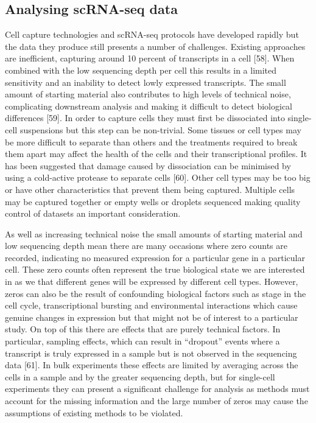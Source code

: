 \documentclass[11pt,a4paper,titlepage,twoside,openright]{style/unimelbthesis}
\theoremstyle{definition}
\theoremstyle{definition}
\theoremstyle{definition}
\theoremstyle{remark}
\begin{document}
\begin{mainmatter}
\hypertarget{intro-analysis}{%
\section{Analysing scRNA-seq data}\label{intro-analysis}}

Cell capture technologies and scRNA-seq protocols have developed rapidly but the data they produce still presents a number of challenges. Existing approaches are inefficient, capturing around 10 percent of transcripts in a cell {[}58{]}. When combined with the low sequencing depth per cell this results in a limited sensitivity and an inability to detect lowly expressed transcripts. The small amount of starting material also contributes to high levels of technical noise, complicating downstream analysis and making it difficult to detect biological differences {[}59{]}. In order to capture cells they must first be dissociated into single-cell suspensions but this step can be non-trivial. Some tissues or cell types may be more difficult to separate than others and the treatments required to break them apart may affect the health of the cells and their transcriptional profiles. It has been suggested that damage caused by dissociation can be minimised by using a cold-active protease to separate cells {[}60{]}. Other cell types may be too big or have other characteristics that prevent them being captured. Multiple cells may be captured together or empty wells or droplets sequenced making quality control of datasets an important consideration.

As well as increasing technical noise the small amounts of starting material and low sequencing depth mean there are many occasions where zero counts are recorded, indicating no measured expression for a particular gene in a particular cell. These zero counts often represent the true biological state we are interested in as we that different genes will be expressed by different cell types. However, zeros can also be the result of confounding biological factors such as stage in the cell cycle, transcriptional bursting and environmental interactions which cause genuine changes in expression but that might not be of interest to a particular study. On top of this there are effects that are purely technical factors. In particular, sampling effects, which can result in \enquote{dropout} events where a transcript is truly expressed in a sample but is not observed in the sequencing data {[}61{]}. In bulk experiments these effects are limited by averaging across the cells in a sample and by the greater sequencing depth, but for single-cell experiments they can present a significant challenge for analysis as methods must account for the missing information and the large number of zeros may cause the assumptions of existing methods to be violated.


\end{mainmatter}
\end{document}
